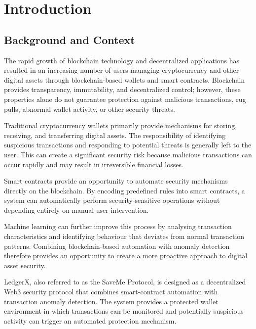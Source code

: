 \documentclass{tietreport}
\author{%
  \texttt{1024030433} Ishan Rehan \\
  \texttt{1024030812} A S Danish \\
  \texttt{1024030813} Shreyansh Dua \\
  \texttt{1024030483} Shaurya Garg%
}
\begin{document}
\maketitle

\tableofcontents


\chapter{Introduction}

\section{Background and Context}

The rapid growth of blockchain technology and decentralized
applications has resulted in an increasing number of users managing
cryptocurrency and other digital assets through blockchain-based
wallets and smart contracts. Blockchain provides transparency,
immutability, and decentralized control; however, these properties
alone do not guarantee protection against malicious transactions,
rug pulls, abnormal wallet activity, or other security threats.

Traditional cryptocurrency wallets primarily provide mechanisms for
storing, receiving, and transferring digital assets. The
responsibility of identifying suspicious transactions and responding
to potential threats is generally left to the user. This can create a
significant security risk because malicious transactions can occur
rapidly and may result in irreversible financial losses.

Smart contracts provide an opportunity to automate security
mechanisms directly on the blockchain. By encoding predefined rules
into smart contracts, a system can automatically perform
security-sensitive operations without depending entirely on manual
user intervention.

Machine learning can further improve this process by analysing
transaction characteristics and identifying behaviour that deviates
from normal transaction patterns. Combining blockchain-based
automation with anomaly detection therefore provides an opportunity
to create a more proactive approach to digital asset security.

LedgerX, also referred to as the SaveMe Protocol, is designed as a
decentralized Web3 security protocol that combines smart-contract
automation with transaction anomaly detection. The system provides a
protected wallet environment in which transactions can be monitored
and potentially suspicious activity can trigger an automated
protection mechanism.
\end{document}
